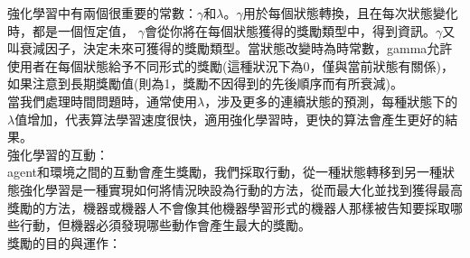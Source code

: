 \documentclass[14pt,a4paper]{report}  %
\begin{document}
\qquad 強化學習中有兩個很重要的常數：$\gamma$和$\lambda$。$\gamma$用於每個狀態轉換，且在每次狀態變化時，都是一個恆定值， 
$\gamma$會從你將在每個狀態獲得的獎勵類型中，得到資訊。$\gamma$又叫衰減因子，決定未來可獲得的獎勵類型。當狀態改變時為時常數，gamma允許使用者在每個狀態給予不同形式的獎勵(這種狀況下為0，僅與當前狀態有關係)，如果注意到長期獎勵值(則為1，獎勵不因得到的先後順序而有所衰減)。\\[6pt]
\qquad 當我們處理時間問題時，通常使用$\lambda$，涉及更多的連續狀態的預測，每種狀態下的$\lambda$值增加，代表算法學習速度很快，適用強化學習時，更快的算法會產生更好的結果。\\[12pt]

強化學習的互動：\\[6pt]
\qquad agent和環境之間的互動會產生獎勵，我們採取行動，從一種狀態轉移到另一種狀態強化學習是一種實現如何將情況映設為行動的方法，從而最大化並找到獲得最高獎勵的方法，機器或機器人不會像其他機器學習形式的機器人那樣被告知要採取哪些行動，但機器必須發現哪些動作會產生最大的獎勵。\\

獎勵的目的與運作：\\
\end{document}

